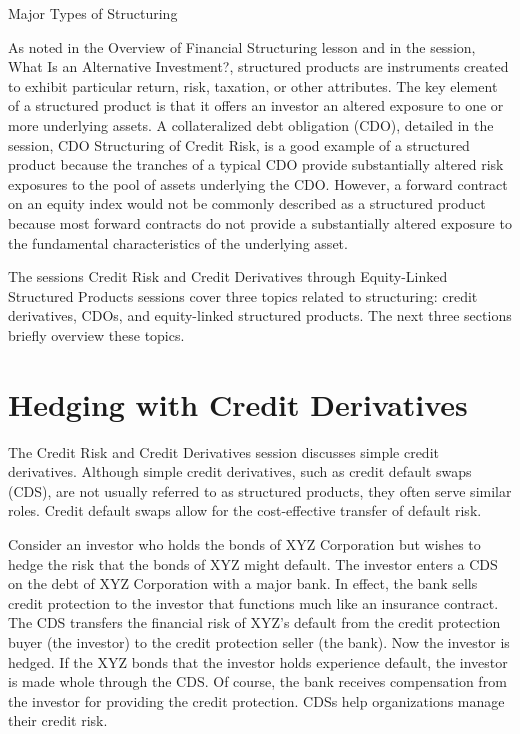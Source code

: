 \documentclass[11pt]{article}
\begin{document}
Major Types of Structuring

As noted in the Overview of Financial Structuring lesson and in the session, What Is an Alternative Investment?, structured products are instruments created to exhibit particular return, risk, taxation, or other attributes. The key element of a structured product is that it offers an investor an altered exposure to one or more underlying assets. A collateralized debt obligation (CDO), detailed in the session, CDO Structuring of Credit Risk, is a good example of a structured product because the tranches of a typical CDO provide substantially altered risk exposures to the pool of assets underlying the CDO. However, a forward contract on an equity index would not be commonly described as a structured product because most forward contracts do not provide a substantially altered exposure to the fundamental characteristics of the underlying asset.

The sessions Credit Risk and Credit Derivatives through Equity-Linked Structured Products sessions cover three topics related to structuring: credit derivatives, CDOs, and equity-linked structured products. The next three sections briefly overview these topics.

\section*{Hedging with Credit Derivatives}
The Credit Risk and Credit Derivatives session discusses simple credit derivatives. Although simple credit derivatives, such as credit default swaps (CDS), are not usually referred to as structured products, they often serve similar roles. Credit default swaps allow for the cost-effective transfer of default risk.

Consider an investor who holds the bonds of XYZ Corporation but wishes to hedge the risk that the bonds of XYZ might default. The investor enters a CDS on the debt of XYZ Corporation with a major bank. In effect, the bank sells credit protection to the investor that functions much like an insurance contract. The CDS transfers the financial risk of XYZ's default from the credit protection buyer (the investor) to the credit protection seller (the bank). Now the investor is hedged. If the XYZ bonds that the investor holds experience default, the investor is made whole through the CDS. Of course, the bank receives compensation from the investor for providing the credit protection. CDSs help organizations manage their credit risk.
\end{document}
